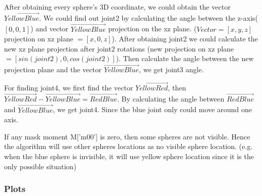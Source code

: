 \documentclass[11pt]{article}
\begin{document}
After obtaining every sphere's 3D coordinate, we could obtain the vector $\Vec{Yellow Blue}$. We could find out joint2 by calculating the angle between the z-axis($[0,0,1]$) and vector $\Vec{Yellow Blue}$ projection on the xz plane. ($Vector=[x,y,z]$ projection on xz plane $= [x, 0, z]$). After obtaining joint2 we could calculate the new xz plane projection after joint2 rotations (new projection on xz plane $= [sin(joint2), 0, cos(joint2)]$). Then calculate the angle between the new projection plane and the vector $\Vec{Yellow Blue}$, we get joint3 angle.

For finding joint4, we first find the vector $\Vec{Yellow Red}$, then $\Vec{Yellow Red} - \Vec{Yellow Blue} = \Vec{Red Blue}$. By calculating the angle between $\Vec{Red Blue}$ and $\Vec{Yellow Blue}$, we get joint4. Since the blue joint only could move around one axis.

If any mask moment M['m00'] is zero, then some spheres are not visible. Hence the algorithm will use other spheres locations as no visible sphere location. (e.g. when the blue sphere is invisible, it will use yellow sphere location since it is the only possible situation)

\subsubsection{Plots}
\end{document}

